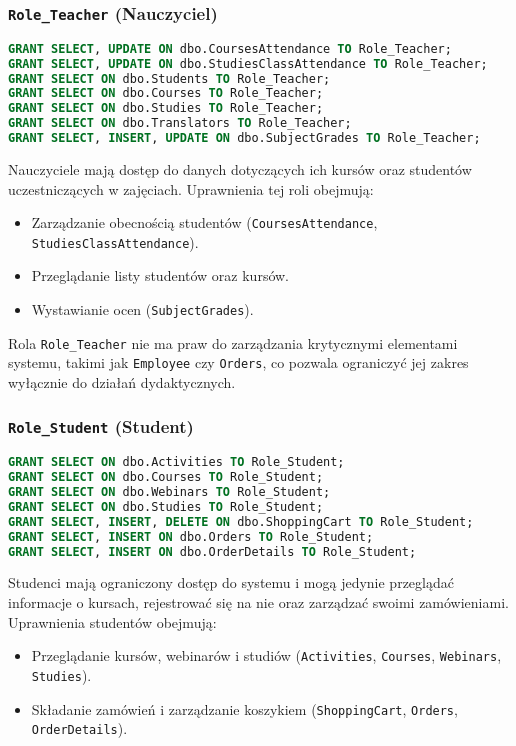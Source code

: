\documentclass[12pt]{article}
\begin{document}
\subsubsection{\texttt{Role\_Teacher} (Nauczyciel)}

\begin{lstlisting}[language=SQL]
GRANT SELECT, UPDATE ON dbo.CoursesAttendance TO Role_Teacher;
GRANT SELECT, UPDATE ON dbo.StudiesClassAttendance TO Role_Teacher;
GRANT SELECT ON dbo.Students TO Role_Teacher;
GRANT SELECT ON dbo.Courses TO Role_Teacher;
GRANT SELECT ON dbo.Studies TO Role_Teacher;
GRANT SELECT ON dbo.Translators TO Role_Teacher;
GRANT SELECT, INSERT, UPDATE ON dbo.SubjectGrades TO Role_Teacher;
\end{lstlisting}


\noindent Nauczyciele mają dostęp do danych dotyczących ich kursów oraz studentów uczestniczących w zajęciach. Uprawnienia tej roli obejmują:
\begin{itemize}
    \item Zarządzanie obecnością studentów (\texttt{CoursesAttendance},  \texttt{StudiesClassAttendance}).
    \item Przeglądanie listy studentów oraz kursów.
    \item Wystawianie ocen (\texttt{SubjectGrades}).
\end{itemize}
Rola \texttt{Role\_Teacher} nie ma praw do zarządzania krytycznymi elementami systemu, takimi jak \texttt{Employee} czy \texttt{Orders}, co pozwala ograniczyć jej zakres wyłącznie do działań dydaktycznych.

\subsubsection{\texttt{Role\_Student} (Student)}

\begin{lstlisting}[language=SQL]
GRANT SELECT ON dbo.Activities TO Role_Student;
GRANT SELECT ON dbo.Courses TO Role_Student;
GRANT SELECT ON dbo.Webinars TO Role_Student;
GRANT SELECT ON dbo.Studies TO Role_Student;
GRANT SELECT, INSERT, DELETE ON dbo.ShoppingCart TO Role_Student;
GRANT SELECT, INSERT ON dbo.Orders TO Role_Student;
GRANT SELECT, INSERT ON dbo.OrderDetails TO Role_Student;
\end{lstlisting}

\noindent Studenci mają ograniczony dostęp do systemu i mogą jedynie przeglądać informacje o kursach, rejestrować się na nie oraz zarządzać swoimi zamówieniami. Uprawnienia studentów obejmują:
\begin{itemize}
    \item Przeglądanie kursów, webinarów i studiów (\texttt{Activities}, \texttt{Courses}, \texttt{Webinars}, \texttt{Studies}).
    \item Składanie zamówień i zarządzanie koszykiem (\texttt{ShoppingCart}, \texttt{Orders}, \texttt{OrderDetails}).

\end{itemize}
\end{document}
